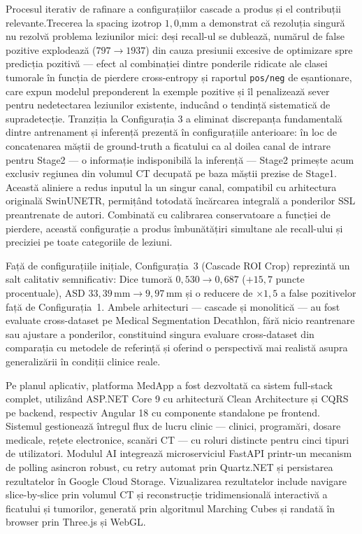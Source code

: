 \documentclass[12pt, a4paper]{report}
\begin{document}
Procesul iterativ de rafinare a configurațiilor cascade a produs și el
contribuții relevante.Trecerea la spacing izotrop $1{,}0$,mm a demonstrat că rezoluția singură nu rezolvă problema leziunilor mici: deși recall-ul se dublează, numărul de false pozitive explodează ($797 \rightarrow 1937$) din cauza presiunii excesive de optimizare spre predicția pozitivă — efect al combinației dintre ponderile ridicate ale clasei tumorale în funcția de pierdere cross-entropy și raportul \texttt{pos/neg} de eșantionare, care expun modelul preponderent la exemple pozitive și îl penalizează sever pentru nedetectarea leziunilor existente, inducând o tendință sistematică de supradetecție. Tranziția la Configurația 3 a eliminat discrepanța fundamentală dintre antrenament și inferență prezentă în configurațiile anterioare: în loc de concatenarea măștii de ground-truth a ficatului ca al doilea canal de intrare pentru Stage2 --- o informație indisponibilă la inferență --- Stage2 primește acum exclusiv regiunea din volumul CT decupată pe baza măștii prezise de Stage1. Această aliniere a redus inputul la un singur canal, compatibil cu arhitectura originală SwinUNETR, permițând totodată încărcarea integrală a ponderilor SSL preantrenate de autori. Combinată cu calibrarea conservatoare a funcției de pierdere, această configurație a produs îmbunătățiri simultane ale recall-ului și preciziei pe toate categoriile de leziuni.

Față de configurațiile inițiale, Configurația~3 (Cascade ROI Crop) reprezintă
un salt calitativ semnificativ: Dice tumoră $0{,}530 \rightarrow 0{,}687$
($+15{,}7$ puncte procentuale), ASD $33{,}39\,\text{mm} \rightarrow
9{,}97\,\text{mm}$ și o reducere de $\times 1{,}5$ a false pozitivelor față
de Configurația~1. Ambele arhitecturi --- cascade și monolitică --- au fost
evaluate cross-dataset pe Medical Segmentation Decathlon, fără nicio reantrenare
sau ajustare a ponderilor, constituind singura evaluare cross-dataset din
comparația cu metodele de referință și oferind o perspectivă mai realistă asupra
generalizării în condiții clinice reale.


Pe planul aplicativ, platforma MedApp a fost dezvoltată ca sistem full-stack
complet, utilizând ASP.NET Core 9 cu arhitectură Clean Architecture și CQRS
pe backend, respectiv Angular 18 cu componente standalone pe frontend.
Sistemul gestionează întregul flux de lucru clinic --- clinici, programări,
dosare medicale, rețete electronice, scanări CT --- cu roluri distincte pentru
cinci tipuri de utilizatori. Modulul AI integrează microserviciul FastAPI
printr-un mecanism de polling asincron robust, cu retry automat prin
Quartz.NET și persistarea rezultatelor în Google Cloud Storage. Vizualizarea
rezultatelor include navigare slice-by-slice prin volumul CT și reconstrucție
tridimensională interactivă a ficatului și tumorilor, generată prin algoritmul
Marching Cubes și randată în browser prin Three.js și WebGL. 
\end{document}
